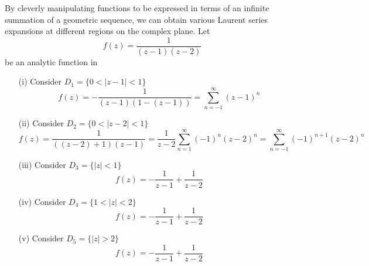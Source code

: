 \begin{ex}
By cleverly manipulating functions to be expressed in terms of an infinite summation of a geometric sequence, we can obtain various Laurent series expansions at different regions on the complex plane. Let
\[f(z)=\dfrac{1}{(z-1)(z-2)}\]
be an analytic function in 
\begin{itemize}
\item[(i)] Consider $D_1=\{ 0<|z-1|<1\}$
\[f(z)=-\dfrac{1}{(z-1)(1-(z-1))}=\sum ^{\infty }_{n=-1}(z-1)^{n}\]
\item[(ii)] Consider $D_2=\{0<|z-2|<1\}$
\[f(z)=\dfrac{1}{((z-2)+1)(z-1)}=\dfrac{1}{z-2}\sum ^{\infty }_{n=1}(-1)^{n}(z-2)^{n}=\sum ^{\infty }_{n=-1}(-1)^{n+1}(z-2)^{n}\]
\item[(iii)] Consider $D_3=\{|z|<1\}$
\[f(z)=-\dfrac{1}{z-1}+\dfrac{1}{z-2}\]
\item[(iv)] Consider $D_4=\{1<|z|<2\}$
\[f(z)=-\dfrac{1}{z-1}+\dfrac{1}{z-2}\]
\item[(v)] Consider $D_5=\{|z|>2\}$
\[f(z)=-\dfrac{1}{z-1}+\dfrac{1}{z-2}\]
\end{itemize}
\end{ex}
\vspace{2ex}


